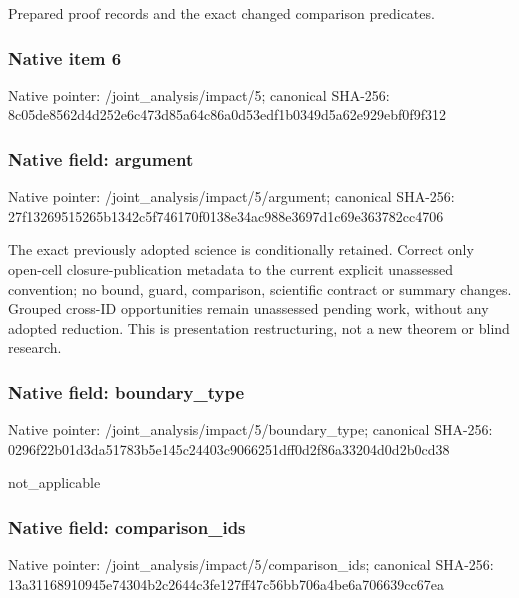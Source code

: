 \documentclass[10pt,a4paper]{article}
\begin{document}
\begingroup\raggedright\sloppy Prepared proof records and the exact changed comparison predicates.\par\endgroup

\subsubsection{Native item 6}
Native pointer: /joint\_\allowbreak{}analysis/impact/5; canonical SHA-256: 8c05de8562d4d252e6c473d85a64c86a0d53edf1b0349d5a62e929ebf0f9f312

\subsubsection{Native field: argument}
Native pointer: /joint\_\allowbreak{}analysis/impact/5/argument; canonical SHA-256: 27f13269515265b1342c5f746170f0138e34ac988e3697d1c69e363782cc4706

\begingroup\raggedright\sloppy The exact previously adopted science is conditionally retained. Correct only open-cell closure-publication metadata to the current explicit unassessed convention;\allowbreak{} no bound,\allowbreak{} guard,\allowbreak{} comparison,\allowbreak{} scientific contract or summary changes. Grouped cross-ID opportunities remain unassessed pending work,\allowbreak{} without any adopted reduction. This is presentation restructuring,\allowbreak{} not a new theorem or blind research.\par\endgroup

\subsubsection{Native field: boundary\_\allowbreak{}type}
Native pointer: /joint\_\allowbreak{}analysis/impact/5/boundary\_\allowbreak{}type; canonical SHA-256: 0296f22b01d3da51783b5e145c24403c9066251dff0d2f86a33204d0d2b0cd38

\begingroup\raggedright\sloppy not\_\allowbreak{}applicable\par\endgroup

\subsubsection{Native field: comparison\_\allowbreak{}ids}
Native pointer: /joint\_\allowbreak{}analysis/impact/5/comparison\_\allowbreak{}ids; canonical SHA-256: 13a31168910945e74304b2c2644c3fe127ff47c56bb706a4be6a706639cc67ea
\end{document}
